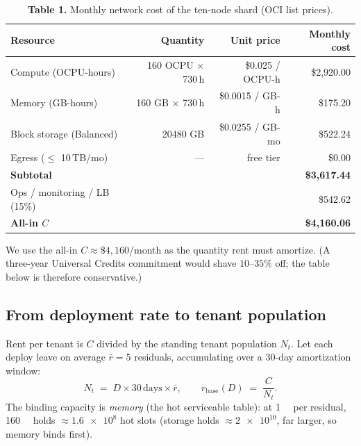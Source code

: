 \documentclass[11pt]{article}
\newcommand{\rent}{r}
\begin{document}
\begin{table}[h]
\centering
\caption*{\textbf{Table 1.} Monthly network cost of the ten-node shard (OCI list prices).}
\begin{tabular}{@{}lrrr@{}}
\toprule
Resource & Quantity & Unit price & Monthly cost \\
\midrule
Compute (OCPU-hours)      & \num{160} OCPU $\times$ 730\,h & \$0.025 / OCPU-h   & \$2{,}920.00 \\
Memory (GB-hours)         & \num{160} GB $\times$ 730\,h   & \$0.0015 / GB-h    & \$175.20 \\
Block storage (Balanced)  & \num{20480} GB                & \$0.0255 / GB-mo   & \$522.24 \\
Egress ($\le$ 10\,TB/mo)  & ---                           & free tier          & \$0.00 \\
\midrule
\textbf{Subtotal}         &                               &                    & \textbf{\$3{,}617.44} \\
Ops / monitoring / LB (15\%) &                            &                    & \$542.62 \\
\midrule
\textbf{All-in $C$}       &                               &                    & \textbf{\$4{,}160.06} \\
\bottomrule
\end{tabular}
\end{table}

\noindent We use the all-in $C\approx\$4{,}160$/month as the quantity rent must amortize. (A three-year Universal Credits commitment would shave $10$--$35\%$ off; the table below is therefore conservative.)

\subsection{From deployment rate to tenant population}
Rent per tenant is $C$ divided by the standing tenant population $N_t$. Let each deploy leave on average $\bar r=5$ residuals, accumulating over a 30-day amortization window:
\[
N_t \;=\; D \times 30\,\text{days} \times \bar r,\qquad
\rent_{\text{base}}(D) \;=\; \frac{C}{N_t}.
\]
The binding capacity is \emph{memory} (the hot serviceable table): at \SI{1}{\kilo\byte} per residual, \SI{160}{\giga\byte} holds $\approx\num{1.6e8}$ hot slots (storage holds $\approx\num{2e10}$, far larger, so memory binds first).
\end{document}
